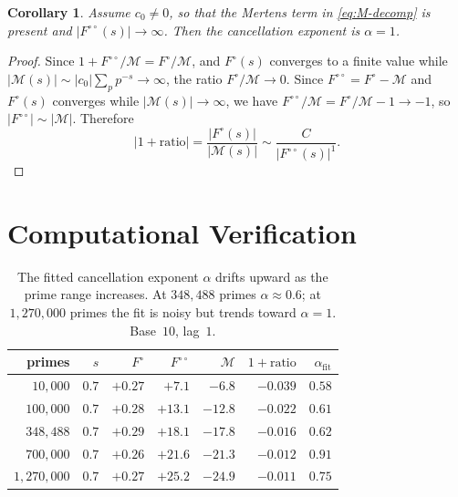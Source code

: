 \documentclass[12pt]{amsart}
\newtheorem{corollary}[theorem]{Corollary}
\theoremstyle{definition}
\theoremstyle{remark}
\begin{document}
\begin{corollary}\label{cor:alpha-one}
Assume $c_0 \ne 0$, so that the Mertens term in
\eqref{eq:M-decomp} is present and
$|F^{\circ\circ}(s)| \to \infty$. Then the cancellation
exponent is $\alpha = 1$.
\end{corollary}

\begin{proof}
Since $1 + F^{\circ\circ}/\mathcal{M} =
F^{\circ}/\mathcal{M}$, and $F^{\circ}(s)$ converges
to a finite value while
$|\mathcal{M}(s)| \sim |c_0| \sum_p p^{-s} \to \infty$,
the ratio $F^{\circ}/\mathcal{M} \to 0$. Since
$F^{\circ\circ} = F^{\circ} - \mathcal{M}$ and
$F^{\circ}(s)$ converges while
$|\mathcal{M}(s)| \to \infty$, we have
$F^{\circ\circ}/\mathcal{M} = F^{\circ}/\mathcal{M}
- 1 \to -1$, so $|F^{\circ\circ}| \sim |\mathcal{M}|$.
Therefore
\[
\bigl|1 + \text{ratio}\bigr|
= \frac{|F^{\circ}(s)|}{|\mathcal{M}(s)|}
\sim \frac{C}{|F^{\circ\circ}(s)|^1}.
\]
\end{proof}

\section{Computational Verification}

\begin{table}[h]
\centering
\begin{tabular}{rrrrrrr}
\toprule
primes & $s$ & $F^{\circ}$ & $F^{\circ\circ}$ &
$\mathcal{M}$ & $1 {+} \text{ratio}$ &
$\alpha_{\text{fit}}$ \\
\midrule
$10{,}000$ & $0.7$ & $+0.27$ & $+7.1$ & $-6.8$
& $-0.039$ & $0.58$ \\
$100{,}000$ & $0.7$ & $+0.28$ & $+13.1$ & $-12.8$
& $-0.022$ & $0.61$ \\
$348{,}488$ & $0.7$ & $+0.29$ & $+18.1$ & $-17.8$
& $-0.016$ & $0.62$ \\
$700{,}000$ & $0.7$ & $+0.26$ & $+21.6$ & $-21.3$
& $-0.012$ & $0.91$ \\
$1{,}270{,}000$ & $0.7$ & $+0.27$ & $+25.2$ & $-24.9$
& $-0.011$ & $0.75$ \\
\bottomrule
\end{tabular}
\caption{The fitted cancellation exponent $\alpha$
drifts upward as the prime range increases. At
$348{,}488$ primes $\alpha \approx 0.6$; at
$1{,}270{,}000$ primes the fit is noisy but trends
toward $\alpha = 1$. Base~$10$, lag~$1$.}
\label{tab:drift}
\end{table}
\end{document}
